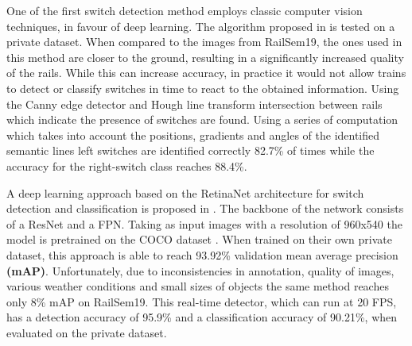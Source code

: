 \documentclass[conference]{IEEEtran}
\begin{document}

One of the first switch detection method employs classic computer vision techniques, in favour of deep learning. The algorithm proposed in \cite{karakose2016detection} is tested on a private dataset. When compared to the images from RailSem19, the ones used in this method are closer to the ground, resulting in a significantly increased quality of the rails. While this can increase accuracy, in practice it would not allow trains to detect or classify switches in time to react to the obtained information. Using the Canny edge detector \cite{canny1986computational} and Hough line transform \cite{duda1972use} intersection between rails which indicate the presence of switches are found. Using a series of computation which takes into account the positions, gradients and angles of the identified semantic lines left switches are identified correctly 82.7\% of times while the accuracy for the right-switch class reaches 88.4\%.

A deep learning approach based on the RetinaNet architecture for switch detection and classification is proposed in \cite{jahan2021deep}. The backbone of the network consists of a ResNet and a FPN. Taking as input images with a resolution of 960x540 the model is pretrained on the COCO dataset \cite{lin2014microsoft}. When trained on their own private dataset, this approach is able to reach 93.92\% validation mean average precision \textbf{(mAP)}. Unfortunately, due to inconsistencies in annotation, quality of images, various weather conditions and small sizes of objects the same method reaches only 8\% mAP on RailSem19. This real-time detector, which can run at 20 FPS, has a detection accuracy of 95.9\% and a classification accuracy of 90.21\%, when evaluated on the private dataset.
\end{document}
